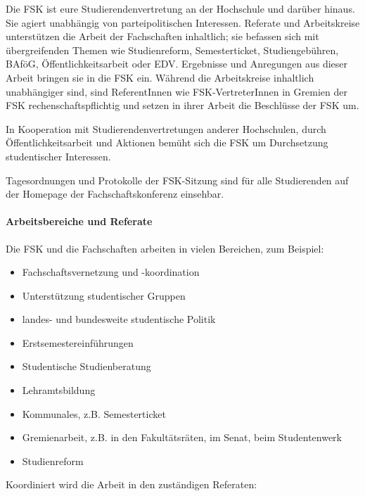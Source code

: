 Die \gls{FSK} ist eure Studierendenvertretung an der Hochschule und darüber hinaus. Sie agiert unabhängig von parteipolitischen Interessen. Referate und Arbeitskreise unterstützen die Arbeit der Fachschaften inhaltlich; sie befassen sich mit übergreifenden Themen wie Studienreform, Semesterticket, Studiengebühren, BAföG, Öffentlichkeitsarbeit oder EDV. Ergebnisse und Anregungen aus dieser Arbeit bringen sie in die \gls{FSK} ein. Während die Arbeitskreise inhaltlich unabhängiger sind, sind ReferentInnen wie \gls{FSK}-VertreterInnen in Gremien der \gls{FSK} rechenschaftspflichtig und setzen in ihrer Arbeit die Beschlüsse der \gls{FSK} um.

In Kooperation mit Studierendenvertretungen anderer Hochschulen, durch Öffentlichkeitsarbeit und Aktionen bemüht sich die \gls{FSK} um Durchsetzung studentischer Interessen.

Tagesordnungen und Protokolle der \gls{FSK}-Sitzung sind für alle Studierenden auf der Homepage der Fachschaftskonferenz einsehbar.

\paragraph{Arbeitsbereiche und Referate}
Die \gls{FSK} und die Fachschaften arbeiten in vielen Bereichen, zum Beispiel:

\vspace{-0.6\baselineskip}
\begin{itemize}
 \addtolength{\itemsep}{-0.6\baselineskip}
 \item Fachschaftsvernetzung und -koordination
 \item Unterstützung studentischer Gruppen
 \item landes- und bundesweite studentische Politik
 \item Erstsemestereinführungen
 \item Studentische Studienberatung
 \item Lehramtsbildung
 \item Kommunales, z.B. Semesterticket
 \item Gremienarbeit, z.B. in den Fakultätsräten, im Senat, beim Studentenwerk
 \item Studienreform
\end{itemize}

Koordiniert wird die Arbeit in den zuständigen Referaten:

